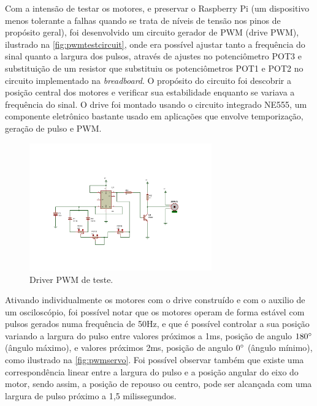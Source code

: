 Com a intensão de testar os motores, e preservar o Raspberry Pi (um dispositivo menos tolerante a falhas quando se trata de níveis de tensão nos pinos de propósito geral), foi desenvolvido um circuito gerador de PWM (drive PWM), ilustrado na \autoref{fig:pwmtestcircuit}, onde era possível ajustar tanto a frequência do sinal quanto a largura dos pulsos, através de ajustes no potenciômetro POT3 e substituição de um resistor que substituiu os potenciômetros POT1 e POT2 no circuito implementado na \textit{breadboard}. O propósito do circuito foi descobrir a posição central dos motores e verificar sua estabilidade enquanto se variava a frequência do sinal. O drive foi montado usando o circuito integrado NE555, um componente eletrônico bastante usado em aplicações que envolve temporização, geração de pulso e PWM. \par

\begin{figure}[H]
	\centering
	\includegraphics[trim={2.5cm 3cm 4cm 3cm},clip,width=0.7\textwidth]{figuras/pwm2.pdf}
	\caption{Driver PWM de teste.}
	\label{fig:pwmtestcircuit}
\end{figure}

Ativando individualmente os motores com o drive construído e com o auxilio de um osciloscópio, foi possível notar que os motores operam de forma estável com pulsos gerados numa frequência de 50Hz, e que é possível controlar a sua posição variando a largura do pulso entre valores próximos a 1ms, posição de angulo $180\degree$ (ângulo máximo), e valores próximos 2ms, posição de angulo $0\degree$ (ângulo mínimo), como ilustrado na \autoref{fig:pwmservo}. Foi possível observar também que existe uma correspondência linear entre a largura do pulso e a posição angular do eixo do motor, sendo assim, a posição de repouso ou centro, pode ser alcançada com uma largura de pulso próximo a 1,5 milissegundos. 

